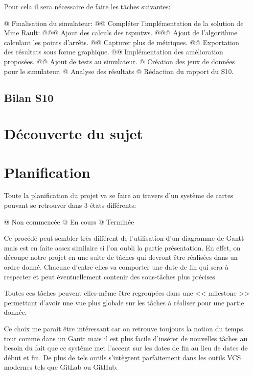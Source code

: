 \documentclass[final]{polytech/polytech}
\begin{document}
			Pour cela il sera nécessaire de faire les tâches suivantes:
			\begin{easylist}[itemize]
				@ Finalisation du simulateur:
				@@ Compléter l'implémentation de la solution de Mme Rault:
				@@@ Ajout des calculs des \glspl{tspmtw}.
				@@@ Ajout de l'algorithme calculant les points d'arrêts.
				@@ Capturer plus de métriques.
				@@ Exportation des résultats sous forme graphique.
				@@ Implémentation des amélioration proposées.
				@@ Ajout de tests au simulateur.
				@ Création des jeux de données pour le simulateur.
				@ Analyse des résultats
				@ Rédaction du rapport du S10.
			\end{easylist}
		
	\section{Bilan S10}
	
\appendix
\chapter{Découverte du sujet}
	
\chapter{Planification\label{sec:plannification}}
	Toute la planification du projet va se faire au travers d'un système de cartes pouvant se retrouver dans 3 états différents:
	\begin{easylist}
		@ Non commencée
		@ En cours
		@ Terminée	
	\end{easylist}
	
	Ce procédé peut sembler très différent de l'utilisation d'un diagramme de Gantt mais est en faite assez similaire si l'on oubli la partie présentation.
	En effet, on découpe notre projet en une suite de tâches qui devront être réalisées dans un ordre donné. Chacune d'entre elles va comporter une date de fin qui sera à respecter et peut éventuellement contenir des sous-tâches plus précises.
	
	Toutes ces tâches peuvent elles-même être regroupées dans une << milestone >> permettant d'avoir une vue plus globale sur les tâches à réaliser pour une partie donnée.
	
	Ce choix me parait être intéressant car on retrouve toujours la notion du temps tout comme dans un Gantt mais il est plus facile d'insérer de nouvelles tâches au besoin du fait que ce système met l'accent sur les dates de fin au lieu de dates de début et fin.
	De plus de tels outils s'intègrent parfaitement dans les outils VCS modernes tels que GitLab ou GitHub.
	
\end{document}
